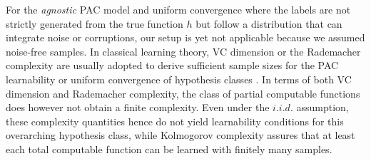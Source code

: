 
For the \textit{agnostic} PAC model and uniform convergence where the labels are not strictly generated from the true function $h$ but follow a distribution that can integrate noise or corruptions, our setup is yet not applicable because we assumed noise-free samples.
In classical learning theory, VC dimension or the Rademacher complexity are usually adopted to derive sufficient sample sizes for the PAC learnability or uniform convergence of hypothesis classes \cite[Chapters 4,6,26]{shalev2014understanding}.
In terms of both VC dimension and Rademacher complexity, the class of partial computable functions does however not obtain a finite complexity.
Even under the $i.i.d.$ assumption, these complexity quantities hence do not yield learnability conditions for this overarching hypothesis class, while Kolmogorov complexity assures that at least each total computable function can be learned with finitely many samples.

